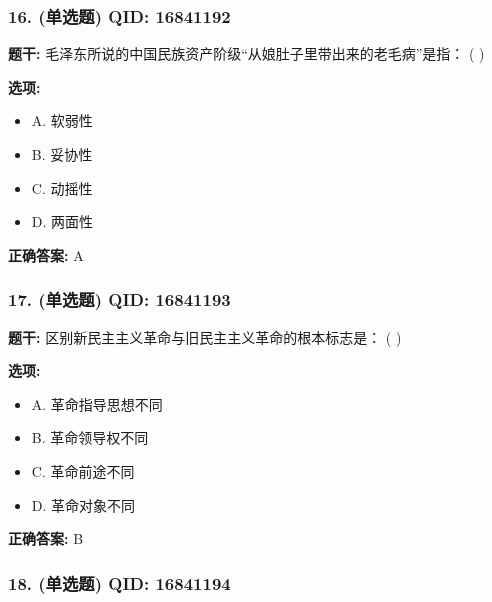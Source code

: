 \documentclass[12pt,UTF8]{ctexart}
\begin{document}
\subsubsection*{16. (单选题) \small QID: 16841192}

\textbf{题干:}
毛泽东所说的中国民族资产阶级“从娘肚子里带出来的老毛病”是指： ( )

\textbf{选项:}
\begin{itemize}[leftmargin=*]

  \item A. 软弱性

  \item B. 妥协性

  \item C. 动摇性

  \item D. 两面性

\end{itemize}

\textbf{正确答案:}
A

\vspace{0.3em}\hrulefill\vspace{0.7em}

\subsubsection*{17. (单选题) \small QID: 16841193}

\textbf{题干:}
区别新民主主义革命与旧民主主义革命的根本标志是： ( )

\textbf{选项:}
\begin{itemize}[leftmargin=*]

  \item A. 革命指导思想不同

  \item B. 革命领导权不同

  \item C. 革命前途不同

  \item D. 革命对象不同

\end{itemize}

\textbf{正确答案:}
B

\vspace{0.3em}\hrulefill\vspace{0.7em}

\subsubsection*{18. (单选题) \small QID: 16841194}
\end{document}
